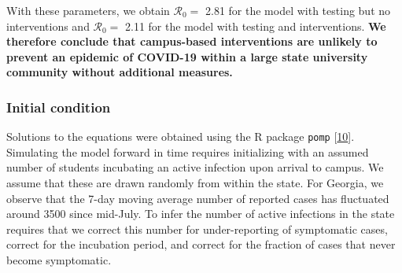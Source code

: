 \documentclass[
]{article}
\begin{document}
With these parameters, we obtain \(\mathcal{R}_{0}=\) 2.81 for the model
with testing but no interventions and \(\mathcal{R}_{0}=\) 2.11 for the
model with testing and interventions. \textbf{We therefore conclude that
campus-based interventions are unlikely to prevent an epidemic of
COVID-19 within a large state university community without additional
measures.}

\hypertarget{initial-condition}{%
\subsubsection{Initial condition}\label{initial-condition}}

Solutions to the equations were obtained using the R package
\texttt{pomp} {[}\protect\hyperlink{ref-King2016-ra}{10}{]}. Simulating
the model forward in time requires initializing with an assumed number
of students incubating an active infection upon arrival to campus. We
assume that these are drawn randomly from within the state. For Georgia,
we observe that the 7-day moving average number of reported cases has
fluctuated around 3500 since mid-July. To infer the number of active
infections in the state requires that we correct this number for
under-reporting of symptomatic cases, correct for the incubation period,
and correct for the fraction of cases that never become symptomatic.
\end{document}
